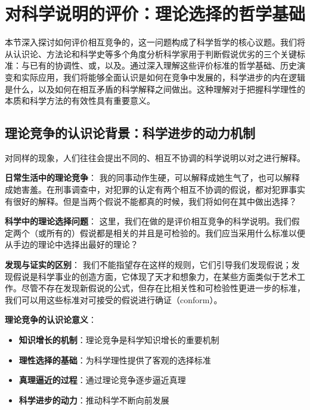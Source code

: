 \section{对科学说明的评价：理论选择的哲学基础}

\begin{logicbox}[title=引言]
本节深入探讨如何评价相互竞争的，这一问题构成了科学哲学的核心议题。我们将从认识论、方法论和科学史等多个角度分析科学家用于判断假说优劣的三个关键标准：与已有的协调性、或，以及。通过深入理解这些评价标准的哲学基础、历史演变和实际应用，我们将能够全面认识是如何在竞争中发展的，科学进步的内在逻辑是什么，以及如何在相互矛盾的科学解释之间做出。这种理解对于把握科学理性的本质和科学方法的有效性具有重要意义。
\end{logicbox}

\subsection{理论竞争的认识论背景：科学进步的动力机制}

\begin{theorembox}[title=理论竞争的普遍性与必然性]
对同样的现象，人们往往会提出不同的、相互不协调的科学说明以对之进行解释。

\textbf{日常生活中的理论竞争}：
我的同事动作生硬，可以解释成她生气了，也可以解释成她害羞。在刑事调查中，对犯罪的认定有两个相互不协调的假说，都对犯罪事实有很好的解释。但是当两个假说不能都真的时候，我们将如何在其中做出选择？

\textbf{科学中的理论选择问题}：
这里，我们在做的是评价相互竞争的科学说明。我们假定两个（或所有的）假说都是相关的并且是可检验的。我们应当采用什么标准以便从手边的理论中选择出最好的理论？

\textbf{发现与证实的区别}：
我们不能指望存在这样的规则，它们引导我们发现假说；发现假说是科学事业的创造方面，它体现了天才和想象力，在某些方面类似于艺术工作。尽管不存在发现新假说的公式，但存在比相关性和可检验性更进一步的标准，我们可以用这些标准对可接受的假说进行确证（conform）。

\textbf{理论竞争的认识论意义}：
\begin{itemize}
\item \textbf{知识增长的机制}：理论竞争是科学知识增长的重要机制
\item \textbf{理性选择的基础}：为科学理性提供了客观的选择标准
\item \textbf{真理逼近的过程}：通过理论竞争逐步逼近真理
\item \textbf{科学进步的动力}：推动科学不断向前发展
\end{itemize}
\end{theorembox}

